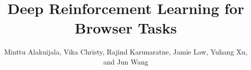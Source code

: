 \documentclass[10pt,journal,compsoc]{IEEEtran}
\begin{document}
%
\title{Deep Reinforcement Learning for Browser Tasks}
%
%
%

%

\author{Minttu Alakuijala, Vika Christy, Rajind Karunaratne, Jamie Law, Yuhang Xu, and Jun Wang
}
\end{document}
